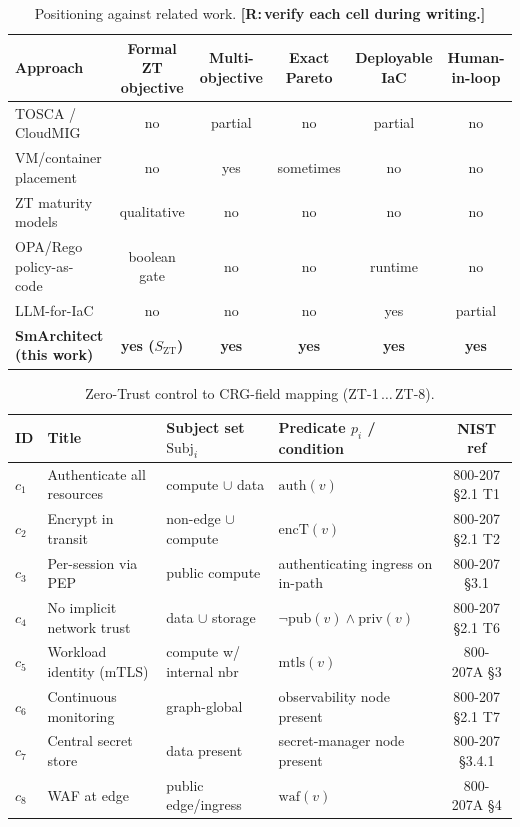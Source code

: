 \documentclass[journal]{IEEEtran}
\newif\ifdraft\drafttrue   %
\newcommand{\result}[1]{\ifdraft\textcolor{resultblue}{\textbf{[R:\,#1]}}\else#1\fi}
\theoremstyle{plain}
\theoremstyle{definition}
\newcommand{\Szt}{S_{\mathrm{ZT}}}
\newcommand{\Subj}{\mathrm{Subj}}
\newcommand{\pub}{\mathrm{pub}}
\begin{document}
\begin{table}[t]
\caption{Positioning against related work. \result{verify each cell during writing.}}
\label{tab:related}
\centering\footnotesize
\begin{tabular}{@{}lccccc@{}}
\toprule
Approach & Formal ZT objective & Multi-objective & Exact Pareto & Deployable IaC & Human-in-loop\\
\midrule
TOSCA / CloudMIG~\cite{tosca2013,frey2011cloudmig} & no & partial & no & partial & no\\
VM/container placement & no & yes & sometimes & no & no\\
ZT maturity models~\cite{nist800207} & qualitative & no & no & no & no\\
OPA/Rego policy-as-code~\cite{opa} & boolean gate & no & no & runtime & no\\
LLM-for-IaC~\cite{llmiac2024} & no & no & no & yes & partial\\
\textbf{SmArchitect (this work)} & \textbf{yes ($\Szt$)} & \textbf{yes} & \textbf{yes} & \textbf{yes} & \textbf{yes}\\
\bottomrule
\end{tabular}
\end{table}

\begin{table}[t]
\caption{Zero-Trust control to CRG-field mapping (ZT-1\,$\ldots$\,ZT-8).}
\label{tab:controls}
\centering\footnotesize
\begin{tabular}{@{}llllc@{}}
\toprule
ID & Title & Subject set $\Subj_i$ & Predicate $p_i$ / condition & NIST ref\\
\midrule
$c_1$ & Authenticate all resources & compute $\cup$ data & $\text{auth}(v)$ & 800-207 \S2.1 T1\\
$c_2$ & Encrypt in transit & non-edge $\cup$ compute & $\text{encT}(v)$ & 800-207 \S2.1 T2\\
$c_3$ & Per-session via PEP & public compute & authenticating ingress on in-path & 800-207 \S3.1\\
$c_4$ & No implicit network trust & data $\cup$ storage & $\neg\pub(v)\wedge\text{priv}(v)$ & 800-207 \S2.1 T6\\
$c_5$ & Workload identity (mTLS) & compute w/ internal nbr & $\text{mtls}(v)$ & 800-207A \S3\\
$c_6$ & Continuous monitoring & graph-global & observability node present & 800-207 \S2.1 T7\\
$c_7$ & Central secret store & data present & secret-manager node present & 800-207 \S3.4.1\\
$c_8$ & WAF at edge & public edge/ingress & $\text{waf}(v)$ & 800-207A \S4\\
\bottomrule
\end{tabular}
\end{table}
\end{document}
